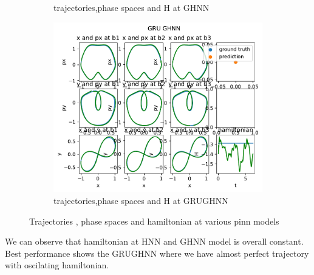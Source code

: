 \begin{figure}[H]
\begin{subfigure}[b]{0.3\textwidth}
		\caption{trajectories,phase spaces and H at GHNN}
		\label{fig:image5}
	\end{subfigure}
	\hfill
	\begin{subfigure}[b]{0.3\textwidth}
		\centering
		\includegraphics[width=\textwidth]{chapters/chapter5/figonly_grughnn_traj.pdf}
		\caption{trajectories,phase spaces and H at GRUGHNN}
		\label{fig:image6}
	\end{subfigure}
	
	\caption{Trajectories , phase spaces and hamiltonian at various pinn models}
	\label{div_traj}
\end{figure}

We can observe that hamiltonian at HNN and GHNN model is overall constant. Best performance shows the GRUGHNN where we have almost perfect trajectory with oscilating hamiltonian.

